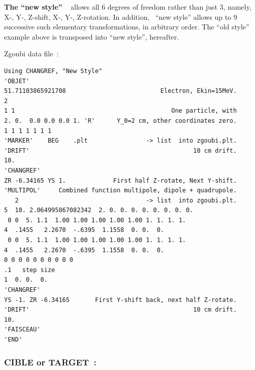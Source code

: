 \bigskip

\noindent \textbf{The ``new style'' \CHANGREF}~ \label{CHANGREFNew}   
    allows all 6 degrees of freedom rather than just 3, namely, X-, Y-, Z-shift, X-, Y-, Z-rotation.  
In addition, \CHANGREF\  ``new style''  allows up to 9 successive such elementary transformations,  in arbitrary order. 
The ``old style'' example above is transposed into  ``new style'',  hereafter. 

\medskip

\begin{center}
\begin{minipage}{.38\linewidth}

 Zgoubi data file~: 

\footnotesize
\begin{verbatim}
Using CHANGREF, "New Style"
'OBJET'
51.71103865921708                          Electron, Ekin=15MeV.
2
1 1                                           One particle, with
2. 0.  0.0 0.0 0.0 1. 'R'      Y_0=2 cm, other coordinates zero.
1 1 1 1 1 1 1 
'MARKER'    BEG    .plt                -> list  into zgoubi.plt.
'DRIFT'                                             10 cm drift.
10.
'CHANGREF'  
ZR -6.34165 YS 1.             First half Z-rotate, Next Y-shift.
'MULTIPOL'     Combined function multipole, dipole + quadrupole.
   2                                   -> list  into zgoubi.plt.
5  10. 2.064995867082342  2. 0. 0. 0. 0. 0. 0. 0. 0.
 0 0  5. 1.1  1.00 1.00 1.00 1.00 1.00 1. 1. 1. 1.                              
4  .1455   2.2670  -.6395  1.1558  0. 0.  0.                                    
 0 0  5. 1.1  1.00 1.00 1.00 1.00 1.00 1. 1. 1. 1.                              
4  .1455   2.2670  -.6395  1.1558  0. 0.  0.                                    
0 0 0 0 0 0 0 0 0 0
.1   step size
1  0. 0.  0.
'CHANGREF'
YS -1. ZR -6.34165       First Y-shift back, next half Z-rotate.
'DRIFT'                                             10 cm drift.
10.
'FAISCEAU'
'END'
\end{verbatim}
\normalsize
\end{minipage}\hspace{.05\linewidth}
\end{center}








\newpage

\subsubsection*{CIBLE or TARGET~: \CIBLETitl}
\label{CIBLE}\label{TARGET}
 
\medskip

